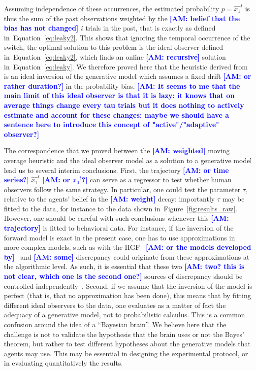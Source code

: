 \documentclass[12pt,english]{article}%
\newcommand{\citep}[1]{\parencite{#1}}
\newcommand{\citet}[1]{\textcite{#1}}
\newcommand{\seeFig}[1]{Figure~\ref{fig:#1}}
\newcommand{\seeEq}[1]{Equation~\ref{eq:#1}}
\newcommand{\AM}[1]{\textbf{\textcolor{blue}{[AM: #1]}}}
\begin{document}
Assuming independence of these occurrences, the estimated probability $p=\hat{x_1}^{t}$ is thus the sum
of the past observations weighted by the \AM{belief that the bias has not changed} $i$ trials in the past, that is exactly 
as defined in~\seeEq{leaky2}.
This shows that ignoring the temporal occurrence of the switch, 
the optimal solution to this problem is the
ideal observer defined in~\seeEq{leaky2},
which finds an online \AM{recursive} solution in~\seeEq{leaky}.
We therefore proved here that the heuristic derived from~\citet{Anderson2006}
is an ideal inversion of the generative model 
which assumes a fixed drift \AM{or rather duration?} in the probability bias. \AM{It seems to me that the main limit of this ideal observer is that it is lazy: it knows that on average things change every tau trials but it does nothing to actively estimate and account for these changes: maybe we should have a sentence here to introduce this concept of "active"/"adaptive" observer?}

The correspondence that we proved between the \AM{weighted} moving average heuristic
and the ideal observer model as a solution to a generative model lead
us to several interim conclusions.
First, the trajectory \AM{or time series?} $\hat{x_1}^{t}$ \AM{or ${x_0}^{t}$?} can serve as a regressor
to test whether human observers follow the same strategy.
In particular, one could test the parameter $\tau$, relative to the agents' belief in the \AM{weight} decay:
importantly $\tau$ may be fitted to the data,
for instance to the data shown in~\seeFig{results_raw}.
However, one should be careful with such conclusions whenever
this \AM{trajectory} is fitted to behavioral data.
For instance, if the inversion of the forward model is exact in the present case,
one has to use approximations in more complex models,
such as with the HGF~\citep{Mathys11} \AM{or the models developed by}~\citet{Wilson13,Wilson18}
and \AM{some} discrepancy could originate from these approximations
at the algorithmic level.
As such, it is essential that these two \AM{two? this is not clear, which one is the second one?} sources of discrepancy
should be controlled independently~\citep{Beck12}.
Second, if we assume that the inversion of the model is perfect
(that is, that no approximation has been done),
this means that by fitting different ideal observers
to the data, one evaluates as a matter of fact the adequacy of
a generative model, not to probabilistic calculus.
This is a common confusion around the idea of a ``Bayesian brain''.
We believe here that the challenge is not to validate the hypothesis that the brain uses or not the Bayes' theorem,
but rather to test different hypotheses about the generative models
that agents may use. 
This may be essential in designing the experimental protocol,
or in evaluating quantitatively the results.
\end{document}
